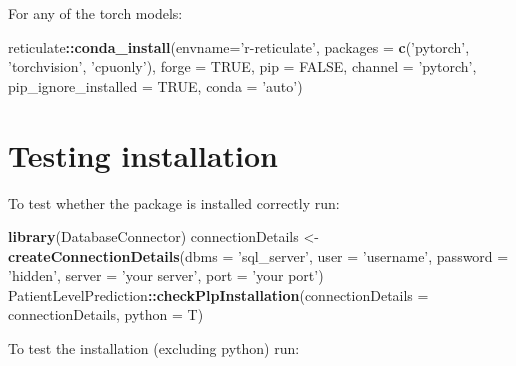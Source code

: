 \documentclass[
]{article}
\newenvironment{Shaded}{\begin{snugshade}}{\end{snugshade}}
\newcommand{\DataTypeTok}[1]{\textcolor[rgb]{0.13,0.29,0.53}{#1}}
\newcommand{\KeywordTok}[1]{\textcolor[rgb]{0.13,0.29,0.53}{\textbf{#1}}}
\newcommand{\NormalTok}[1]{#1}
\newcommand{\OperatorTok}[1]{\textcolor[rgb]{0.81,0.36,0.00}{\textbf{#1}}}
\newcommand{\OtherTok}[1]{\textcolor[rgb]{0.56,0.35,0.01}{#1}}
\newcommand{\StringTok}[1]{\textcolor[rgb]{0.31,0.60,0.02}{#1}}
\begin{document}
For any of the torch models:

\begin{Shaded}
\begin{Highlighting}[]
\NormalTok{reticulate}\OperatorTok{::}\KeywordTok{conda_install}\NormalTok{(}\DataTypeTok{envname=}\StringTok{'r-reticulate'}\NormalTok{, }\DataTypeTok{packages =} \KeywordTok{c}\NormalTok{(}\StringTok{'pytorch'}\NormalTok{, }\StringTok{'torchvision'}\NormalTok{, }\StringTok{'cpuonly'}\NormalTok{), }\DataTypeTok{forge =} \OtherTok{TRUE}\NormalTok{, }\DataTypeTok{pip =} \OtherTok{FALSE}\NormalTok{, }\DataTypeTok{channel =} \StringTok{'pytorch'}\NormalTok{, }\DataTypeTok{pip_ignore_installed =} \OtherTok{TRUE}\NormalTok{, }\DataTypeTok{conda =} \StringTok{'auto'}\NormalTok{)}
\end{Highlighting}
\end{Shaded}

\hypertarget{testing-installation}{%
\section{Testing installation}\label{testing-installation}}

To test whether the package is installed correctly run:

\begin{Shaded}
\begin{Highlighting}[]
\KeywordTok{library}\NormalTok{(DatabaseConnector)}
\NormalTok{connectionDetails <-}\StringTok{ }\KeywordTok{createConnectionDetails}\NormalTok{(}\DataTypeTok{dbms =} \StringTok{'sql_server'}\NormalTok{, }
                                             \DataTypeTok{user =} \StringTok{'username'}\NormalTok{, }
                                             \DataTypeTok{password =} \StringTok{'hidden'}\NormalTok{, }
                                             \DataTypeTok{server =} \StringTok{'your server'}\NormalTok{, }
                                             \DataTypeTok{port =} \StringTok{'your port'}\NormalTok{)}
\NormalTok{PatientLevelPrediction}\OperatorTok{::}\KeywordTok{checkPlpInstallation}\NormalTok{(}\DataTypeTok{connectionDetails =}\NormalTok{ connectionDetails, }
                                             \DataTypeTok{python =}\NormalTok{ T)}
\end{Highlighting}
\end{Shaded}

To test the installation (excluding python) run:
\end{document}
